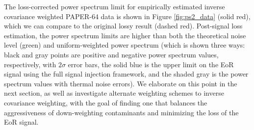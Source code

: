 \documentclass[preprint2,numberedappendix,tighten]{aastex6}  %
\newcommand{\cc}[1]{{\color{purple} \textbf{[CC: #1]}}}
\begin{document}
%


The loss-corrected power spectrum limit for empirically estimated inverse covariance weighted PAPER-64 data is shown in Figure \ref{fig:ps2_data} (solid red), which we can compare to the original lossy result (dashed red). %
Post-signal loss estimation, the power spectrum limits are higher than both the theoretical noise level (green) and uniform-weighted power spectrum (which is shown three ways: black and gray points are positive and negative power spectrum values, respectively, with $2\sigma$ error bars, the solid blue is the upper limit on the EoR signal using the full signal injection framework, and the shaded gray is the power spectrum values with thermal noise errors). We elaborate on this point in the next section, as well as investigate alternate 
weighting schemes to inverse covariance weighting, with the goal of finding one that balances the aggressiveness of down-weighting contaminants and minimizing the loss of the EoR signal. 
\end{document}
